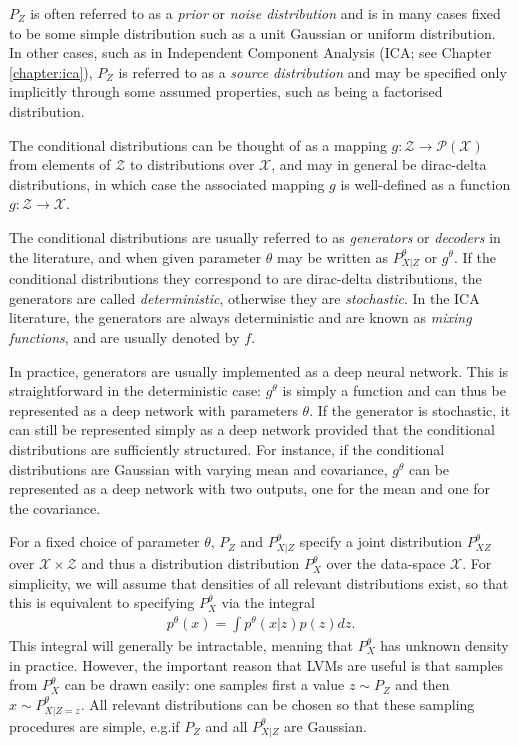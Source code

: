 

$P_Z$ is often referred to as a \emph{prior} or \emph{noise distribution} and is in many cases fixed to be some simple distribution such as a unit Gaussian or uniform distribution. 
In other cases, such as in Independent Component Analysis (ICA; see Chapter \ref{chapter:ica}), $P_Z$ is referred to as a \emph{source distribution} and may be specified only implicitly through some assumed properties, such as being a factorised distribution.

The conditional distributions can be thought of as a mapping $g:\mathcal{Z}\to\mathcal{P}(\mathcal{X})$ from elements of $\mathcal{Z}$ to distributions over $\mathcal{X}$,
and may in general be dirac-delta distributions, in which case the associated mapping $g$ is well-defined as a function $g:\mathcal{Z}\to\mathcal{X}$. 

The conditional distributions are usually referred to as \emph{generators} or \emph{decoders} in the literature, and when given parameter $\theta$ may be written as $P_{X|Z}^\theta$ or $g^\theta$. 
If the conditional distributions they correspond to are dirac-delta distributions, the generators are called \emph{deterministic}, otherwise they are \emph{stochastic}.
In the ICA literature, the generators are always deterministic and are known as \emph{mixing functions}, and are usually denoted by $f$.

In practice, generators are usually implemented as a deep neural network.
This is straightforward in the deterministic case: $g^\theta$ is simply a function and can thus be represented as a deep network with parameters $\theta$.
If the generator is stochastic, it can still be represented simply as a deep network provided that the conditional distributions are sufficiently structured. 
For instance, if the conditional distributions are Gaussian with varying mean and covariance, $g^\theta$ can be represented as a deep network with two outputs, one for the mean and one for the covariance.

For a fixed choice of parameter $\theta$, $P_Z$ and $P^\theta_{X|Z}$ specify a joint distribution $P^\theta_{XZ}$ over $\mathcal{X} \times \mathcal{Z}$ and thus a distribution distribution $P_X^\theta$ over the data-space $\mathcal{X}$. 
For simplicity, we will assume that densities of all relevant distributions exist, so that this is equivalent to specifying $P_X^\theta$ via the integral
%
\begin{align*}
p^\theta(x) = \int p^\theta(x|z) p(z) dz.
\end{align*}
%
This integral will generally be intractable, meaning that $P_X^\theta$ has unknown density in practice.
However, the important reason that LVMs are useful is that samples from $P_X^\theta$ can be drawn easily:
one samples first a value $z\sim P_Z$ and then $x \sim P^\theta_{X|Z=z}$. 
All relevant distributions can be chosen so that these sampling procedures are simple, e.g.\:if $P_Z$ and all $P^\theta_{X|Z}$ are Gaussian. 



